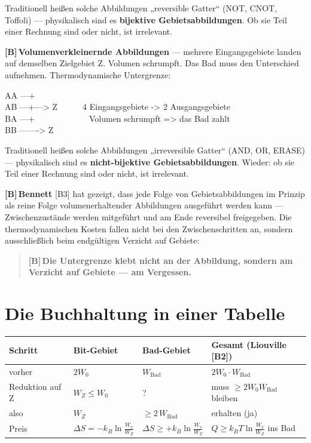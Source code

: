 \documentclass[11pt,a4paper]{article}
\newcommand{\LB}{\textcolor{layB}{\textbf{\footnotesize\textsf{[B]}}}\,}
\begin{document}
Traditionell heißen solche Abbildungen „reversible Gatter“ (NOT, CNOT, Toffoli)
--- physikalisch sind es \textbf{bijektive Gebietsabbildungen}. Ob sie Teil einer
Rechnung sind oder nicht, ist irrelevant.

\LB \textbf{Volumenverkleinernde Abbildungen} --- mehrere Eingangsgebiete landen
auf demselben Zielgebiet Z. Volumen schrumpft. Das Bad muss den Unterschied
aufnehmen. Thermodynamische Untergrenze:

\begin{center}
\begin{minipage}{0.75\textwidth}
\ttfamily\small
AA ---+\\
AB ---+---> Z\ \ \ \ \ \ 4 Eingangsgebiete -> 2 Ausgangsgebiete\\
BA ---+\ \ \ \ \ \ \ \ \ \ \ \ \ Volumen schrumpft => das Bad zahlt\\
BB -------> Z
\end{minipage}
\end{center}

Traditionell heißen solche Abbildungen „irreversible Gatter“ (AND, OR, ERASE) ---
physikalisch sind es \textbf{nicht-bijektive Gebietsabbildungen}. Wieder: ob sie
Teil einer Rechnung sind oder nicht, ist irrelevant.

\LB \textbf{Bennett} [B3] hat gezeigt, dass jede Folge von Gebietsabbildungen im
Prinzip als reine Folge volumenerhaltender Abbildungen ausgeführt werden kann ---
Zwischenzustände werden mitgeführt und am Ende reversibel freigegeben. Die
thermodynamischen Kosten fallen nicht bei den Zwischenschritten an, sondern
ausschließlich beim endgültigen Verzicht auf Gebiete:

\begin{quote}
\LB \textbf{Die Untergrenze klebt nicht an der Abbildung, sondern am Verzicht auf
Gebiete --- am Vergessen.}
\end{quote}

\section{Die Buchhaltung in einer Tabelle}

\begin{center}
\small
\begin{tabular}{@{}llll@{}}
\toprule
\textbf{Schritt} & \textbf{Bit-Gebiet} & \textbf{Bad-Gebiet} & \textbf{Gesamt (Liouville [B2])} \\
\midrule
vorher & $2W_0$ & $W_{\text{Bad}}$ & $2W_0 \cdot W_{\text{Bad}}$ \\
Reduktion auf Z & $W_Z \le W_0$ & ? & muss $\ge 2W_0 W_{\text{Bad}}$ bleiben \\
also & $W_Z$ & $\ge 2\,W_{\text{Bad}}$ & erhalten (ja) \\
Preis & $\Delta S = -k_B \ln\frac{W_{\text{v}}}{W_Z}$ & $\Delta S \ge +k_B \ln\frac{W_{\text{v}}}{W_Z}$ & $Q \ge k_B T \ln\frac{W_{\text{v}}}{W_Z}$ ins Bad \\
\bottomrule
\end{tabular}
\end{center}
\end{document}
